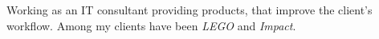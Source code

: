 
Working as an IT consultant providing products, that improve the client's
workflow. Among my clients have been \emph{LEGO} and \emph{Impact}.
